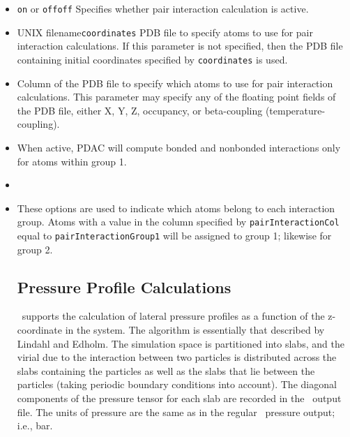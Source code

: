 \begin{itemize}

\item
{}
{{\tt on} or {\tt off}}{{\tt off}}
{Specifies whether pair interaction calculation is active.}

\item
{}
{UNIX filename}{{\tt coordinates}}
{PDB file to specify atoms to use for pair interaction calculations.  If 
this parameter is not specified, then the PDB file containing initial 
coordinates specified by {\tt coordinates} is used.}

\item
{}
{
Column of the PDB file to specify which atoms to use for pair interaction
calculations.  This parameter may specify any of the floating point
fields of the PDB file, either X, Y, Z, occupancy, or beta-coupling
(temperature-coupling).  
}

\item
{}
{
When active, PDAC will compute bonded and nonbonded interactions only for atoms 
within group 1.  
}
 
\item
{}

\item
{}
{
These options are used to indicate which atoms belong to each interaction 
group.  Atoms with a value in the column specified by {\tt pairInteractionCol} 
equal to {\tt pairInteractionGroup1} will be assigned to group 1; likewise
for group 2.
}

\subsection{Pressure Profile Calculations}
\PDAC\ supports the calculation of lateral pressure profiles as a function of
the z-coordinate in the system.  The algorithm is essentially that described
by Lindahl and Edholm.  The simulation space is partitioned into slabs, and
the virial due to the interaction between two particles is distributed across 
the slabs containing the particles as well as the slabs that lie between the
particles (taking periodic boundary conditions into account).  The diagonal
components of the pressure tensor for each slab are recorded in the 
\PDAC\ output file.  The units of pressure are the same as in the regular 
\PDAC\ pressure output; i.e., bar.


\end{itemize}
